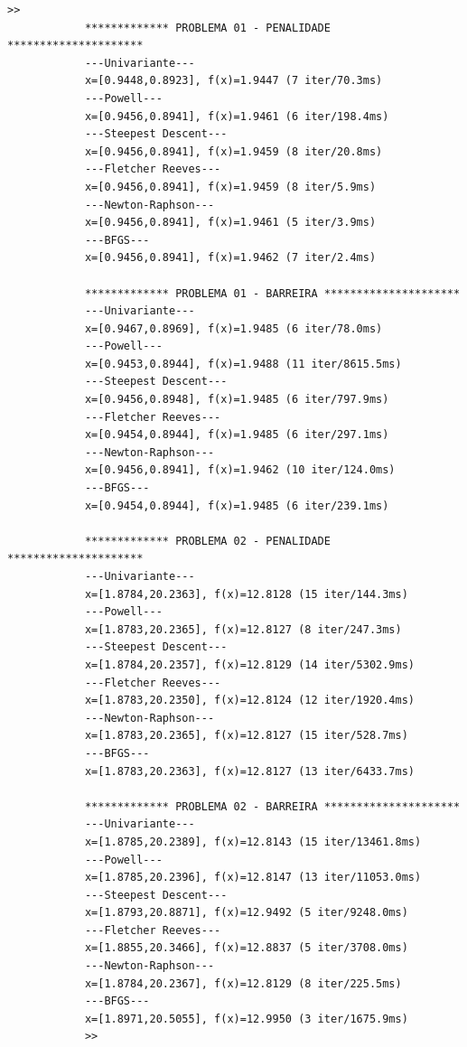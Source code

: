 \documentclass[10pt, a4paper]{article}
\begin{document}
\begin{minipage}{\linewidth}
      \begin{lstlisting}[style=myStyle, caption=resultado da execu\c c\~ao do script, label=list_output]
            >>
            ************* PROBLEMA 01 - PENALIDADE *********************
            ---Univariante---
            x=[0.9448,0.8923], f(x)=1.9447 (7 iter/70.3ms)
            ---Powell---
            x=[0.9456,0.8941], f(x)=1.9461 (6 iter/198.4ms)
            ---Steepest Descent---
            x=[0.9456,0.8941], f(x)=1.9459 (8 iter/20.8ms)
            ---Fletcher Reeves---
            x=[0.9456,0.8941], f(x)=1.9459 (8 iter/5.9ms)
            ---Newton-Raphson---
            x=[0.9456,0.8941], f(x)=1.9461 (5 iter/3.9ms)
            ---BFGS---
            x=[0.9456,0.8941], f(x)=1.9462 (7 iter/2.4ms)

            ************* PROBLEMA 01 - BARREIRA *********************
            ---Univariante---
            x=[0.9467,0.8969], f(x)=1.9485 (6 iter/78.0ms)
            ---Powell---
            x=[0.9453,0.8944], f(x)=1.9488 (11 iter/8615.5ms)
            ---Steepest Descent---
            x=[0.9456,0.8948], f(x)=1.9485 (6 iter/797.9ms)
            ---Fletcher Reeves---
            x=[0.9454,0.8944], f(x)=1.9485 (6 iter/297.1ms)
            ---Newton-Raphson---
            x=[0.9456,0.8941], f(x)=1.9462 (10 iter/124.0ms)
            ---BFGS---
            x=[0.9454,0.8944], f(x)=1.9485 (6 iter/239.1ms)

            ************* PROBLEMA 02 - PENALIDADE *********************
            ---Univariante---
            x=[1.8784,20.2363], f(x)=12.8128 (15 iter/144.3ms)
            ---Powell---
            x=[1.8783,20.2365], f(x)=12.8127 (8 iter/247.3ms)
            ---Steepest Descent---
            x=[1.8784,20.2357], f(x)=12.8129 (14 iter/5302.9ms)
            ---Fletcher Reeves---
            x=[1.8783,20.2350], f(x)=12.8124 (12 iter/1920.4ms)
            ---Newton-Raphson---
            x=[1.8783,20.2365], f(x)=12.8127 (15 iter/528.7ms)
            ---BFGS---
            x=[1.8783,20.2363], f(x)=12.8127 (13 iter/6433.7ms)

            ************* PROBLEMA 02 - BARREIRA *********************
            ---Univariante---
            x=[1.8785,20.2389], f(x)=12.8143 (15 iter/13461.8ms)
            ---Powell---
            x=[1.8785,20.2396], f(x)=12.8147 (13 iter/11053.0ms)
            ---Steepest Descent---
            x=[1.8793,20.8871], f(x)=12.9492 (5 iter/9248.0ms)
            ---Fletcher Reeves---
            x=[1.8855,20.3466], f(x)=12.8837 (5 iter/3708.0ms)
            ---Newton-Raphson---
            x=[1.8784,20.2367], f(x)=12.8129 (8 iter/225.5ms)
            ---BFGS---
            x=[1.8971,20.5055], f(x)=12.9950 (3 iter/1675.9ms)
            >>
      \end{lstlisting}
\end{minipage}



\end{document}
